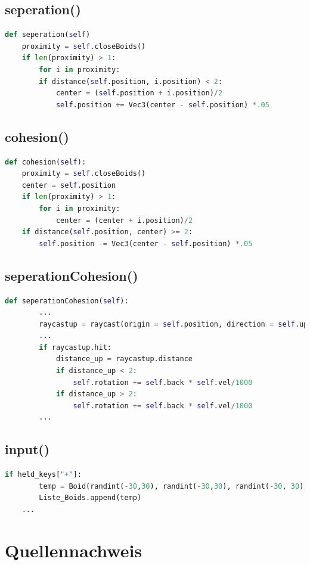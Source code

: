 \documentclass[a4paper, hidelinks, 12pt]{article}
\begin{document}
\subsection{seperation()}\label{Codeseperation}
\begin{lstlisting}[style=mystyle, language=Python]
def seperation(self)
	proximity = self.closeBoids()
	if len(proximity) > 1:
		for i in proximity:
		if distance(self.position, i.position) < 2:
			center = (self.position + i.position)/2
			self.position += Vec3(center - self.position) *.05
\end{lstlisting}
\subsection{cohesion()}\label{Codecohesion}
\begin{lstlisting}[style=mystyle, language=Python]
def cohesion(self):
	proximity = self.closeBoids()
	center = self.position
	if len(proximity) > 1:
		for i in proximity:
			center = (center + i.position)/2
	if distance(self.position, center) >= 2:
		self.position -= Vec3(center - self.position) *.05
\end{lstlisting}
\subsection{seperationCohesion()}\label{CodeseperationCohesion}
\begin{lstlisting}[style=mystyle, language=Python]
	def seperationCohesion(self):
		...
		raycastup = raycast(origin = self.position, direction = self.up, distance = 5, traverse_target = scene, ignore = (Wireframe,))
		...
		if raycastup.hit:
			distance_up = raycastup.distance
			if distance_up < 2:
				self.rotation += self.back * self.vel/1000
			if distance_up > 2:
				self.rotation += self.back * self.vel/1000
		...
\end{lstlisting}
\subsection{input()}\label{Codeinput}
\begin{lstlisting}[style=mystyle, language=Python]
	if held_keys["+"]:
		temp = Boid(randint(-30,30), randint(-30,30), randint(-30, 30), randint(0,360), randint(0,360), randint(0,360), uniform(50.0, 300.0), uniform(0.0, 10.0), 300.0, 1, groesse)
		Liste_Boids.append(temp)
	...
\end{lstlisting}
\newpage

\section{Quellennachweis}
\tiny
\newpage
\end{document}
